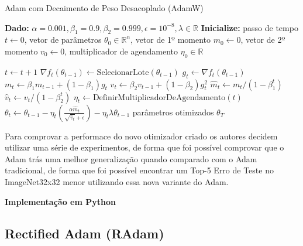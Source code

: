 \begin{algorithm}[H]
    \caption{Adam com Decaimento de Peso Desacoplado (AdamW)}
    \label{alg:adamw}
    \begin{algorithmic}[1]

    \State \textbf{Dado:} $\alpha=0.001, \beta_1=0.9, \beta_2=0.999, \epsilon=10^{-8}, \lambda \in \mathbb{R}$
    \State \textbf{Inicialize:} passo de tempo $t \leftarrow 0$, vetor de parâmetros $\theta_0 \in \mathbb{R}^n$, vetor de 1º momento $m_0 \leftarrow 0$, vetor de 2º momento $v_0 \leftarrow 0$, multiplicador de agendamento $\eta_0 \in \mathbb{R}$

    \Repeat
        \State $t \leftarrow t + 1$
        \State $\nabla f_t(\theta_{t-1}) \leftarrow \text{SelecionarLote}(\theta_{t-1})$ 
        \State $g_t \leftarrow \nabla f_t(\theta_{t-1})$ 
        \State $m_t \leftarrow \beta_1 m_{t-1} + (1 - \beta_1) g_t$ 
        \State $v_t \leftarrow \beta_2 v_{t-1} + (1 - \beta_2) g_t^2$ 
        \State $\hat{m}_t \leftarrow m_t / (1 - \beta_1^t)$ 
        \State $\hat{v}_t \leftarrow v_t / (1 - \beta_2^t)$ 
        \State $\eta_t \leftarrow \text{DefinirMultiplicadorDeAgendamento}(t)$ 
        \State $\theta_t \leftarrow \theta_{t-1} - \eta_t \left( \frac{\alpha \hat{m}_t}{\sqrt{\hat{v}_t} + \epsilon} \right) - \eta_t \lambda \theta_{t-1}$ 
    \State \Return parâmetros otimizados $\theta_T$
    \end{algorithmic}
\end{algorithm}

Para comprovar a performace do novo otimizador criado os autores decidem utilizar uma série de experimentos, de forma que foi possível comprovar que o Adam trás uma melhor generalização quando comparado com o Adam tradicional, de forma que foi possível encontrar um Top-5 Erro de Teste no ImageNet32x32 menor utilizando essa nova variante do Adam.

\textbf{Implementação em Python}

\subsection{Rectified Adam (RAdam)}

